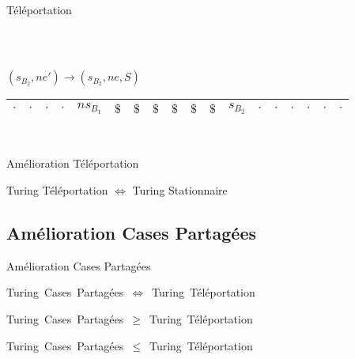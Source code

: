 \documentclass[12pt]{beamer}
\begin{document}
\begin{frame}{Téléportation}
\begin{center}
\begin{tabular}{|c|c|c|c|c|c|c|c|c|c|c|c|c|c|c|c|c|c|}
\end{tabular}\\

\pause
\pause
\pause
\pause
\pause
\pause

\vspace{0.5cm}

    $(s_{B_2},ne') \longrightarrow (s_{B_2}, ne, S)$\\



    
\begin{tabular}{|c|c|c|c|c|c|c|c|c|c|c|c|c|c|c|c|c|c|}\hline
     $\cdot$ & $\cdot$ & $\cdot$ & $\cdot$ & $ns_{B_1}$ & $\$$ & $\$$ & $\$$ & $\$$ & $\$$ & $\$$ & $s_{B_2}$ & $\cdot$ & $\cdot$ & $\cdot$ & $\cdot$ & $\cdot$ & $\cdot$ \\\hline    
     
\end{tabular}\\

    \end{center}
\end{frame}

\begin{frame}{Amélioration Téléportation}
\begin{center}
    \begin{tcolorbox}[colframe=red, hbox]
    \large Turing Téléportation $\Longleftrightarrow$ Turing Stationnaire
\end{tcolorbox}
\end{center}

\end{frame}

\subsection{Amélioration Cases Partagées}
\begin{frame}{Amélioration Cases Partagées}
    \begin{center}
    \mbox{\large Turing Cases Partagées $\Longleftrightarrow$ Turing Téléportation}

    \pause

    \vspace{1cm}

    \mbox{\large Turing Cases Partagées $\geq$ Turing Téléportation}

    \pause

    \vspace{1cm}

    \mbox{\large Turing Cases Partagées $\leq$ Turing Téléportation}
    \end{center}
\end{frame}
\end{document}
